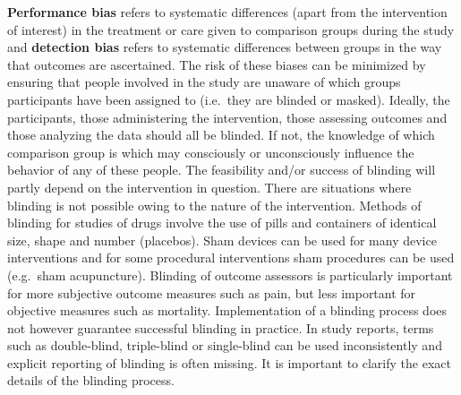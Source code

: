 \documentclass[
  10pt,
  a4paper,
  DIV=11,
  numbers=noendperiod]{scrreprt}
\begin{document}
\textbf{Performance bias} refers to systematic differences (apart from
the intervention of interest) in the treatment or care given to
comparison groups during the study and \textbf{detection bias} refers to
systematic differences between groups in the way that outcomes are
ascertained. The risk of these biases can be minimized by ensuring that
people involved in the study are unaware of which groups participants
have been assigned to (i.e.~they are blinded or masked). Ideally, the
participants, those administering the intervention, those assessing
outcomes and those analyzing the data should all be blinded. If not, the
knowledge of which comparison group is which may consciously or
unconsciously influence the behavior of any of these people. The
feasibility and/or success of blinding will partly depend on the
intervention in question. There are situations where blinding is not
possible owing to the nature of the intervention. Methods of blinding
for studies of drugs involve the use of pills and containers of
identical size, shape and number (placebos). Sham devices can be used
for many device interventions and for some procedural interventions sham
procedures can be used (e.g.~sham acupuncture). Blinding of outcome
assessors is particularly important for more subjective outcome measures
such as pain, but less important for objective measures such as
mortality. Implementation of a blinding process does not however
guarantee successful blinding in practice. In study reports, terms such
as double-blind, triple-blind or single-blind can be used inconsistently
and explicit reporting of blinding is often missing. It is important to
clarify the exact details of the blinding process.
\end{document}
